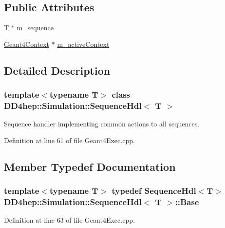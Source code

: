 \subsection*{Public Attributes}
\begin{DoxyCompactItemize}
\item 
\hyperlink{class_t}{T} $\ast$ \hyperlink{class_d_d4hep_1_1_simulation_1_1_sequence_hdl_ae825c3a994baf6bb24fd37e547a67dff}{m\_\-sequence}
\item 
\hyperlink{class_d_d4hep_1_1_simulation_1_1_geant4_context}{Geant4Context} $\ast$ \hyperlink{class_d_d4hep_1_1_simulation_1_1_sequence_hdl_addf2b3ddaa1263ae4213a5189f7859b5}{m\_\-activeContext}
\end{DoxyCompactItemize}


\subsection{Detailed Description}
\subsubsection*{template$<$typename T$>$ class DD4hep::Simulation::SequenceHdl$<$ T $>$}

Sequence handler implementing common actions to all sequences. 

Definition at line 61 of file Geant4Exec.cpp.

\subsection{Member Typedef Documentation}
\hypertarget{class_d_d4hep_1_1_simulation_1_1_sequence_hdl_a447b2bee9267559ffef742eef84fb1cc}{
\subsubsection[{Base}]{\setlength{\rightskip}{0pt plus 5cm}template$<$typename T$>$ typedef {\bf SequenceHdl}$<${\bf T}$>$ {\bf DD4hep::Simulation::SequenceHdl}$<$ {\bf T} $>$::{\bf Base}}}
\label{class_d_d4hep_1_1_simulation_1_1_sequence_hdl_a447b2bee9267559ffef742eef84fb1cc}


Definition at line 63 of file Geant4Exec.cpp.

